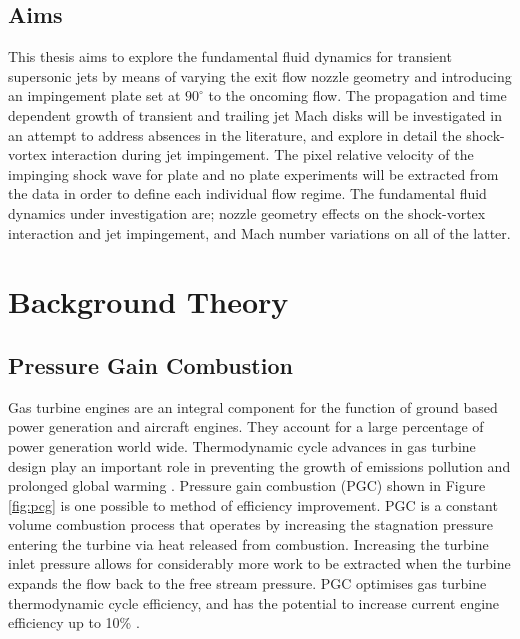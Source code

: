\subsection{Aims}
This thesis aims to explore the fundamental fluid dynamics for transient supersonic jets by means of varying the exit flow nozzle geometry and introducing an impingement plate set at $90^{\circ}$ to the oncoming flow. The propagation and time dependent growth of transient and trailing jet Mach disks will be investigated in an attempt to address absences in the literature, and explore in detail the shock-vortex interaction during jet impingement. The pixel relative velocity of the impinging shock wave for plate and no plate experiments will be extracted from the data in order to define each individual flow regime. The fundamental fluid dynamics under investigation are; nozzle geometry effects on the shock-vortex interaction and jet impingement, and Mach number variations on all of the latter.


\newpage

\section{Background Theory} \label{sec:background}
\subsection{Pressure Gain Combustion}
Gas turbine engines are an integral component for the function of ground based power generation and aircraft engines. They account for a large percentage of power generation world wide. Thermodynamic cycle advances in gas turbine design play an important role in preventing the growth of emissions pollution and prolonged global warming \cite{paxson2018pressure}. Pressure gain combustion (PGC) shown in Figure \ref{fig:pcg} is one possible to method of efficiency improvement. PGC is a constant volume combustion process that operates by increasing the stagnation pressure entering the turbine via heat released from combustion. Increasing the turbine inlet pressure allows for considerably more work to be extracted when the turbine expands the flow back to the free stream pressure. PGC optimises gas turbine thermodynamic cycle efficiency, and has the potential to increase current engine efficiency up to 10\% \cite{gulen2013constant}.


